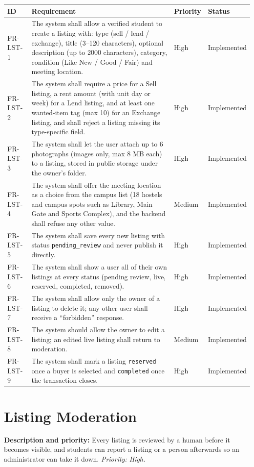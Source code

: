\documentclass[11pt,a4paper]{scrreprt}
\newenvironment{reqtable}{%
  \small
  \begin{longtable}{>{\raggedright\arraybackslash\ttfamily\footnotesize}p{2.05cm} L{8.85cm} L{1.45cm} L{2.05cm}}
  \toprule
  \normalfont\normalsize\textbf{ID} & \textbf{Requirement} & \textbf{Priority} & \textbf{Status}\\
  \midrule\endhead
  \bottomrule\endfoot
}{\end{longtable}}
\newcommand{\impl}{Implemented}
\begin{document}
\begin{reqtable}
FR-LST-1 & The system shall allow a verified student to create a listing with: type (sell / lend / exchange), title (3--120 characters), optional description (up to 2000 characters), category, condition (Like New / Good / Fair) and meeting location. & High & \impl\\
FR-LST-2 & The system shall require a price for a Sell listing, a rent amount (with unit day or week) for a Lend listing, and at least one wanted-item tag (max 10) for an Exchange listing, and shall reject a listing missing its type-specific field. & High & \impl\\
FR-LST-3 & The system shall let the user attach up to 6 photographs (images only, max 8 MB each) to a listing, stored in public storage under the owner's folder. & High & \impl\\
FR-LST-4 & The system shall offer the meeting location as a choice from the campus list (18 hostels and campus spots such as Library, Main Gate and Sports Complex), and the backend shall refuse any other value. & Medium & \impl\\
FR-LST-5 & The system shall save every new listing with status \texttt{pending_review} and never publish it directly. & High & \impl\\
FR-LST-6 & The system shall show a user all of their own listings at every status (pending review, live, reserved, completed, removed). & High & \impl\\
FR-LST-7 & The system shall allow only the owner of a listing to delete it; any other user shall receive a ``forbidden'' response. & High & \impl\\
FR-LST-8 & The system should allow the owner to edit a listing; an edited live listing shall return to moderation. & Medium & \impl\\
FR-LST-9 & The system shall mark a listing \texttt{reserved} once a buyer is selected and \texttt{completed} once the transaction closes. & High & \impl\\
\end{reqtable}

\section{Listing Moderation}
\textbf{Description and priority:} Every listing is reviewed by a human
before it becomes visible, and students can report a listing or a person
afterwards so an administrator can take it down. \emph{Priority: High.}
\end{document}
